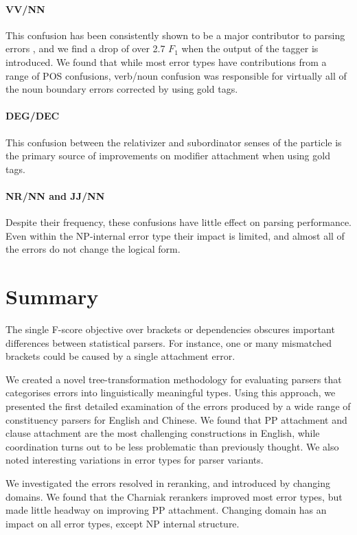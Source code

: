 \paragraph{VV/NN}  This confusion has been consistently shown to be a major
contributor to parsing errors
\parencite{Levy-Manning:2003:ACL,Tse-Curran:2012:NAACL-HLT,Qian-Liu:2012:EMNLP},
and we find a drop of over 2.7 $F_1$ when the output of the tagger is
introduced.  We found that while most error types have contributions from a
range of POS confusions, verb/noun confusion was responsible for virtually all of
the noun boundary errors corrected by using gold tags.

\paragraph{DEG/DEC}  This confusion between the relativizer and subordinator
senses of the particle  is the primary
source of improvements on modifier attachment when using gold tags.

\paragraph{NR/NN and JJ/NN}  Despite their frequency, these confusions have
little effect on parsing performance.  Even within the NP-internal error type
their impact is limited, and almost all of the errors do not change the
logical form.

\section{Summary}

The single F-score objective over brackets or dependencies obscures important differences between statistical parsers.
For instance, one or many mismatched brackets could be caused by a single attachment error.

We created a novel tree-transformation methodology for
evaluating parsers that categorises errors into linguistically meaningful
types.  Using this approach, we presented the first detailed examination of the
errors produced by a wide range of constituency parsers for
English and Chinese.  We found that PP attachment and clause attachment are the most
challenging constructions in English, while coordination turns out to be less problematic
than previously thought.  We also noted interesting variations in error types
for parser variants.

We investigated the errors resolved in reranking, and introduced by changing
domains. We found that the Charniak rerankers improved most error types, but
made little headway on improving PP attachment.  Changing domain has an impact
on all error types, except NP internal structure.

